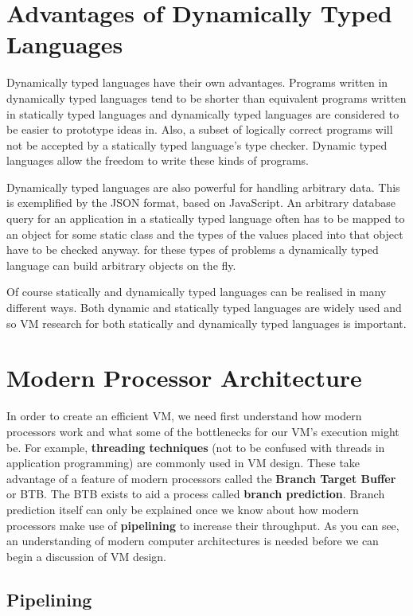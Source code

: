 \documentclass[english,a4paper]{report}
\begin{document}
\section{Advantages of Dynamically Typed Languages} 
Dynamically typed languages have their own advantages. Programs
written in dynamically typed languages tend to be shorter than
equivalent programs written in statically typed languages and
dynamically typed languages are considered to be easier to prototype
ideas in. Also, a subset of logically correct programs will not be
accepted by a statically typed language's type checker. Dynamic typed
languages allow the freedom to write these kinds of programs.

Dynamically typed languages are also powerful for handling arbitrary
data. This is exemplified by the JSON format, based on JavaScript. An
arbitrary database query for an application in a statically typed
language often has to be mapped to an object for some static class and
the types of the values placed into that object have to be checked
anyway. for these types of problems a dynamically typed language can
build arbitrary objects on the fly.

Of course statically and dynamically typed languages can be realised
in many different ways. Both dynamic and statically typed languages
are widely used and so VM research for both statically and dynamically
typed languages is important.

\section{Modern Processor Architecture}

In order to create an efficient VM, we need first understand how
modern processors work and what some of the bottlenecks for our VM's
execution might be. For example, \textbf{threading techniques} (not to
be confused with threads in application programming) are commonly used
in VM design. These take advantage of a feature of modern processors
called the \textbf{Branch Target Buffer} or BTB. The BTB exists to aid a
process called \textbf{branch prediction}. Branch prediction itself can
only be explained once we know about how modern processors make use of
\textbf{pipelining} to increase their throughput. As you can see, an
understanding of modern computer architectures is needed before we can
begin a discussion of VM design.

\subsection{Pipelining}
\end{document}

